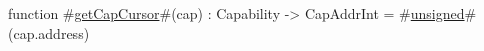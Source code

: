 function #\hyperref[sailRISCVzgetCapCursor]{getCapCursor}#(cap) : Capability -> CapAddrInt = #\hyperref[sailRISCVzunsigned]{unsigned}#(cap.address)
